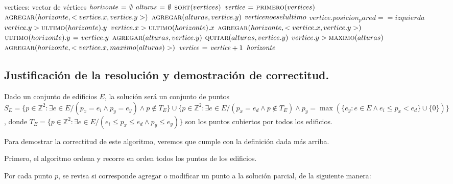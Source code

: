 \begin{codebox}
\li \Comment vertices: vector de vértices
\li $\id{horizonte} \gets \emptyset$
\li $\id{alturas} \gets \emptyset$
\li $\textnormal{\scshape sort}(vertices)$
\li $\id{vertice} \gets \proc{primero}(vertices)$
\li $\textnormal{\scshape agregar}(horizonte, <vertice.x, vertice.y>)$
\li $\textnormal{\scshape agregar}(alturas, vertice.y)$
\li \While $\id{vertice} no es el ultimo$
      \Do
\li     \If $vertice.posicion_pared == izquierda$
          \Then
\li         \If $vertice.y > \textnormal{\scshape ultimo}(horizonte).y$
              \Then
\li             \If $vertice.x > \textnormal{\scshape ultimo}(horizonte).x$
                  \Then
\li                 $\textnormal{\scshape agregar}(horizonte, <vertice.x, vertice.y>)$
\li               \Else
\li                 $\textnormal{\scshape ultimo}(horizonte).y \mathrel{\hspace{1pt}=\hspace{1pt}} vertice.y$
                 \End
              \End
\li         $\textnormal{\scshape agregar}(alturas, vertice.y)$
\li       \Else
\li         $\textnormal{\scshape quitar}(alturas, vertice.y)$
\li         \If $vertice.y > \textnormal{\scshape maximo}(alturas)$
              \Then
\li             $\textnormal{\scshape agregar}(horizonte, <vertice.x, maximo(alturas)>)$
              \End
          \End
\li     $\id{vertice} \gets \id{vertice} + 1$
      \End
\li \Return $\id{horizonte}$
\end{codebox}



\subsection{Justificación de la resolución y demostración de correctitud.}

\vspace*{0.3cm}


Dado un conjunto de edificios $E$, la solución será un conjunto de puntos
$S_E = \{p \in \mathbb{Z}^2 : \exists e \in E / (p_x = e_i \land p_y = e_y) \land
p \notin T_E\} \cup \{p \in \mathbb{Z}^2 : \exists e \in E / (p_x = e_d \land p
\notin T_E) \land p_y = \max({\{e_y : e \in E \land e_i \leq p_x < e_d\} \cup \{0\}})\}$,
donde $T_E = \{p \in \mathbb{Z}^2 : \exists e \in E / (e_i \leq p_x \leq e_d \land p_y \leq e_y)\}$
son los puntos cubiertos por todos los edificios.

Para demostrar la correctitud de este algoritmo, veremos que cumple con la
definición dada más arriba.

Primero, el algoritmo ordena y recorre en orden todos los puntos de los edificios.

Por cada punto $p$, se revisa si corresponde agregar o modificar un punto a la
solución parcial, de la siguiente manera:


